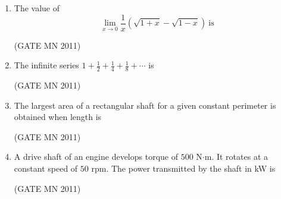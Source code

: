\documentclass[journal]{IEEEtran}
\begin{document}
\begin{enumerate}
\begin{enumerate}
\end{enumerate}

\item The value of 
\[
\lim_{x \to 0} \frac{1}{x} \left( \sqrt{1+x} - \sqrt{1-x} \right) \ \text{is}
\]

\hfill(GATE MN 2011)
\begin{enumerate}
\end{enumerate}

\item The infinite series $1 + \frac{1}{2} + \frac{1}{4} + \frac{1}{8} + \cdots$ is

	\hfill(GATE MN 2011)
\begin{enumerate}
\end{enumerate}

\item The largest area of a rectangular shaft for a given constant perimeter is obtained when length is

	\hfill(GATE MN 2011)

\begin{enumerate}
\end{enumerate}

\item A drive shaft of an engine develops torque of $500$ N$\cdot$m. It rotates at a constant speed of $50$ rpm. The power transmitted by the shaft in kW is

	\hfill(GATE MN 2011)
\begin{enumerate}
\end{enumerate}


\end{enumerate}
\end{document}

